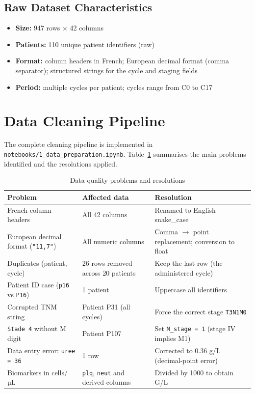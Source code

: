 \documentclass[12pt,a4paper]{report}
\begin{document}
\subsection{Raw Dataset Characteristics}
\begin{itemize}
  \item \textbf{Size:} 947 rows $\times$ 42 columns
  \item \textbf{Patients:} 110 unique patient identifiers (raw)
  \item \textbf{Format:} column headers in French; European decimal format (comma separator); structured strings for the cycle and staging fields
  \item \textbf{Period:} multiple cycles per patient; cycles range from C0 to C17
\end{itemize}

\section{Data Cleaning Pipeline}

The complete cleaning pipeline is implemented in \texttt{notebooks/1\_data\_preparation.ipynb}. Table~\ref{tab:cleaning} summarises the main problems identified and the resolutions applied.

\begin{table}[H]
\centering
\caption{Data quality problems and resolutions}
\label{tab:cleaning}
\begin{tabular}{p{4cm}p{5cm}p{5cm}}
\toprule
\textbf{Problem} & \textbf{Affected data} & \textbf{Resolution} \\
\midrule
French column headers & All 42 columns & Renamed to English snake\_case \\
European decimal format (\texttt{"11,7"}) & All numeric columns & Comma $\to$ point replacement; conversion to float \\
Duplicates (patient, cycle) & 26 rows removed across 20 patients & Keep the last row (the administered cycle) \\
Patient ID case (\texttt{p16} vs \texttt{P16}) & 1 patient & Uppercase all identifiers \\
Corrupted TNM string & Patient P31 (all cycles) & Force the correct stage \texttt{T3N1M0} \\
\texttt{Stade 4} without M digit & Patient P107 & Set \texttt{M\_stage = 1} (stage IV implies M1) \\
Data entry error: \texttt{uree = 36} & 1 row & Corrected to 0.36 g/L (decimal-point error) \\
Biomarkers in cells/µL & \texttt{plq}, \texttt{neut} and derived columns & Divided by 1000 to obtain G/L \\
\bottomrule
\end{tabular}
\end{table}
\end{document}
